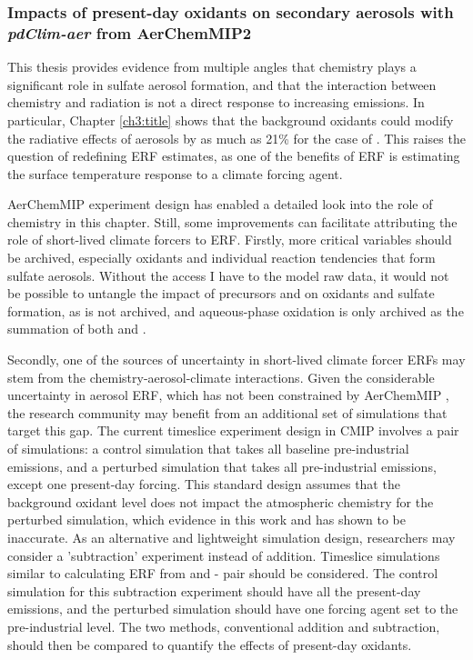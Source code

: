 \subsubsection{Impacts of present-day oxidants on secondary aerosols with \textit{pdClim-aer} from AerChemMIP2}

This thesis provides evidence from multiple angles that chemistry plays a significant role in sulfate aerosol formation, and that the interaction between chemistry and radiation is not a direct response to increasing emissions. In particular, Chapter \ref{ch3:title} shows that the background oxidants could modify the radiative effects of aerosols by as much as 21\% for the case of . This raises the question of redefining ERF estimates, as one of the benefits of ERF is estimating the surface temperature response to a climate forcing agent. 


AerChemMIP experiment design has enabled a detailed look into the role of chemistry in this chapter. Still, some improvements can facilitate attributing the role of short-lived climate forcers to ERF. Firstly, more critical variables should be archived, especially oxidants and individual reaction tendencies that form sulfate aerosols. Without the access I have to the model raw data, it would not be possible to untangle the impact of  precursors and  on oxidants and sulfate formation, as  is not archived, and aqueous-phase oxidation is only archived as the summation of both  and . 

Secondly, one of the sources of uncertainty in short-lived climate forcer ERFs may stem from the chemistry-aerosol-climate interactions. Given the considerable uncertainty in aerosol ERF, which has not been constrained by AerChemMIP \citep{bellouinBoundingGlobalAerosol2020}, the research community may benefit from an additional set of simulations that target this gap. The current timeslice experiment design in CMIP involves a pair of simulations: a control simulation that takes all baseline pre-industrial emissions, and a perturbed simulation that takes all pre-industrial emissions, except one present-day forcing. This standard design assumes that the background oxidant level does not impact the atmospheric chemistry for the perturbed simulation, which evidence in this work and \citet{karsetStrongImpactsAerosol2018} has shown to be inaccurate. As an alternative and lightweight simulation design, researchers may consider a 'subtraction' experiment instead of addition. Timeslice simulations similar to calculating ERF from \histsst{} and \histsst{}-\sstpiaer{} pair should be considered. The control simulation for this subtraction experiment should have all the present-day emissions, and the perturbed simulation should have one forcing agent set to the pre-industrial level. The two methods, conventional addition and subtraction, should then be compared to quantify the effects of present-day oxidants. 

